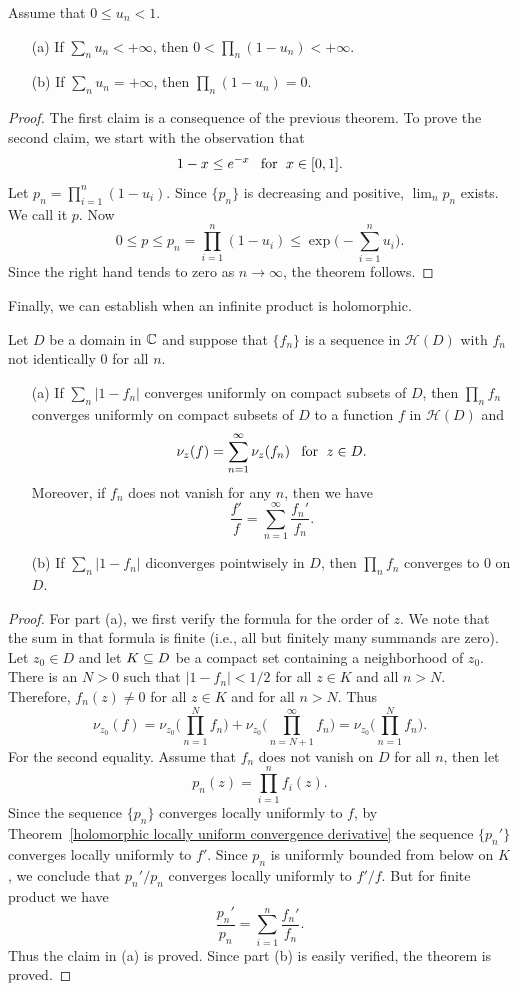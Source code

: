 \begin{theorem}\label{infinite product 0<u<1}
Assume that $0\leq u_n<1$.
\begin{itemize}
\item[(a)] If $\sum_nu_n<+\infty$, then $0<\prod_n(1-u_n)<+\infty$.
\item[(b)] If $\sum_nu_n=+\infty$, then $\prod_{n}(1-u_n)=0$.
\end{itemize}
\end{theorem}
\begin{proof}
The first claim is a consequence of the previous theorem. To prove the second claim, we start with the observation that
\[1-x\leq e^{-x}\hspace{8pt}\text{for}\hspace{6pt} x\in[0,1].\]
Let $p_n=\prod_{i=1}^{n}(1-u_i)$. Since $\{p_n\}$ is decreasing and positive, $\lim_np_n$ exists. We call it $p$. Now
\[0\leq p\leq p_n=\prod_{i=1}^{n}(1-u_i)\leq\exp\Big(-\sum_{i=1}^{n}u_i\Big).\]
Since the right hand tends to zero as $n\to\infty$, the theorem follows.
\end{proof}
Finally, we can establish when an infinite product is holomorphic.
\begin{theorem}\label{infinite product of holomorphic function}
Let $D$ be a domain in $\mathbb{C}$ and suppose that $\{f_n\}$ is a sequence in $\mathcal{H}(D)$ with $f_n$ not identically $0$ for all $n$.
\begin{itemize}
\item[(a)] If $\sum_{n}|1-f_n|$ converges uniformly on compact subsets of $D$, then $\prod_{n}f_n$ converges uniformly on compact subsets of $D$ to a function $f$ in $\mathcal{H}(D)$ and
\[\nu_{z}(f)=\sum_{n=1}^{\infty}\nu_z(f_n)\hspace{8pt}\text{for}\hspace{6pt} z\in D.\]
Moreover, if $f_n$ does not vanish for any $n$, then we have
\[\frac{f'}{f}=\sum_{n=1}^{\infty}\frac{f_n'}{f_n}.\]
\item[(b)] If $\sum_{n}|1-f_n|$ diconverges pointwisely in $D$, then $\prod_{n}f_n$ converges to $0$ on $D$.
\end{itemize}
\end{theorem}
\begin{proof}
For part (a), we first verify the formula for the order of $z$. We note that the sum in that formula is finite (i.e., all but finitely many summands are zero). Let $z_0\in D$ and let $K\subseteq D$ be a compact set containing a neighborhood of $z_0$. There is an $N>0$ such that $|1-f_n|<1/2$ for all $z\in K$ and all $n>N$. Therefore, $f_n(z)\neq 0$ for all $z\in K$ and for all $n>N$. Thus
\[\nu_{z_0}(f)=\nu_{z_0}\Big(\prod_{n=1}^{N}f_n\Big)+\nu_{z_0}\Big(\prod_{n=N+1}^{\infty}f_n\Big)=\nu_{z_0}\Big(\prod_{n=1}^{N}f_n\Big).\]
For the second equality. Assume that $f_n$ does not vanish on $D$ for all $n$, then let
\[p_n(z)=\prod_{i=1}^{n}f_i(z).\]
Since the sequence $\{p_n\}$ converges locally uniformly to $f$, by Theorem~\ref{holomorphic locally uniform convergence derivative} the sequence $\{p_n'\}$ converges locally uniformly to $f'$. Since $p_n$ is uniformly bounded from below on $K$, we conclude that $p_n'/p_n$ converges locally uniformly to $f'/f$. But for finite product we have
\[\frac{p_n'}{p_n}=\sum_{i=1}^{n}\frac{f_n'}{f_n}.\]
Thus the claim in (a) is proved. Since part (b) is easily verified, the theorem is proved.
\end{proof}
